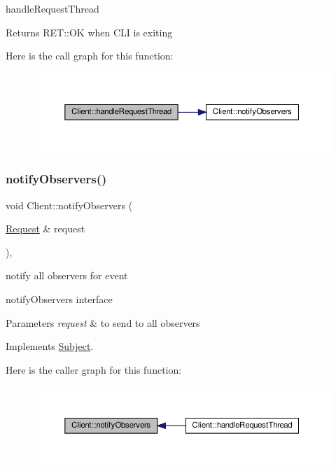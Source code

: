 handle\+Request\+Thread \begin{DoxyReturn}{Returns}
R\+E\+T\+::\+OK when C\+LI is exiting 
\end{DoxyReturn}
Here is the call graph for this function\+:\nopagebreak
\begin{figure}[H]
\begin{center}
\leavevmode
\includegraphics[width=350pt]{classClient_a39187196db33ecd252c342fffa7039ef_cgraph}
\end{center}
\end{figure}
\mbox{\label{classClient_a2fb08fe51afa68997faa22474e114771}} 
\subsubsection{\texorpdfstring{notify\+Observers()}{notifyObservers()}}
{\footnotesize\ttfamily void Client\+::notify\+Observers (\begin{DoxyParamCaption}\item[{\hyperlink{classRequest}{Request} \&}]{request }\end{DoxyParamCaption})\hspace{0.3cm}{\ttfamily [override]}, {\ttfamily [virtual]}}



notify all observers for event 

notify\+Observers interface


\begin{DoxyParams}{Parameters}
{\em request} & to send to all observers \\
\hline
\end{DoxyParams}


Implements \hyperlink{classSubject_ad779772e3bcf5b3bd8f7a96b10531920}{Subject}.

Here is the caller graph for this function\+:\nopagebreak
\begin{figure}[H]
\begin{center}
\leavevmode
\includegraphics[width=350pt]{classClient_a2fb08fe51afa68997faa22474e114771_icgraph}
\end{center}
\end{figure}
\mbox{\label{classClient_a1426f0582287f6c583d8681e540059ab}} 
